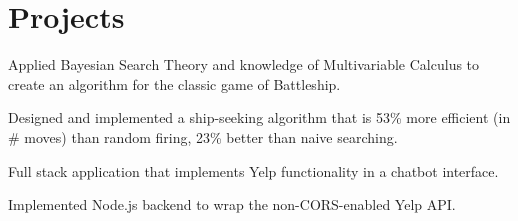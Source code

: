 \documentclass[]{deedy-resume-openfont}
\begin{document}
\begin{minipage}[t]{0.66\textwidth}
%
%


\section{Projects}
\begin{tightemize}
\item Applied Bayesian Search Theory and knowledge of Multivariable Calculus to create an algorithm for the classic game of Battleship. 
\item Designed and implemented a ship-seeking algorithm that is 53\% more efficient (in \# moves) than random firing, 23\% better than naive searching.
\end{tightemize}

\sectionsep
{}
\begin{tightemize}
\item Full stack application that implements Yelp functionality in a chatbot interface. 
\item Implemented Node.js backend to wrap the non-CORS-enabled Yelp API. 
\end{tightemize}
\sectionsep




\end{minipage}
\end{document}
